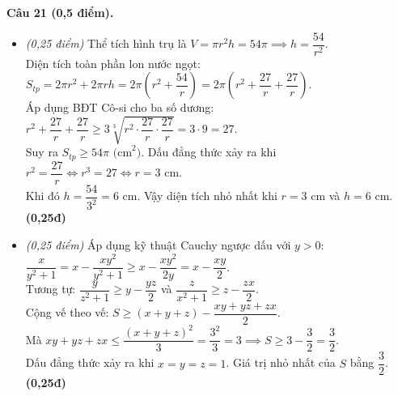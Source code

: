 \documentclass[11pt,a4paper]{article}
\begin{document}
\vspace{1.5mm}
\noindent
\textbf{Câu 21 (0,5 điểm).}
\begin{itemize}
  \item[a)] \textit{(0,25 điểm)}
  Thể tích hình trụ là $V = \pi r^2 h = 54\pi \implies h = \dfrac{54}{r^2}$.\\
  Diện tích toàn phần lon nước ngọt:
  $S_{tp} = 2\pi r^2 + 2\pi r h = 2\pi \left( r^2 + \dfrac{54}{r} \right) = 2\pi \left( r^2 + \dfrac{27}{r} + \dfrac{27}{r} \right)$.\\
  Áp dụng BĐT Cô-si cho ba số dương:
  $r^2 + \dfrac{27}{r} + \dfrac{27}{r} \ge 3\sqrt[3]{r^2 \cdot \dfrac{27}{r} \cdot \dfrac{27}{r}} = 3 \cdot 9 = 27$.\\
  Suy ra $S_{tp} \ge 54\pi\text{ (cm}^2)$. Dấu đẳng thức xảy ra khi $r^2 = \dfrac{27}{r} \iff r^3 = 27 \iff r = 3\text{ cm}$.\\
  Khi đó $h = \dfrac{54}{3^2} = 6\text{ cm}$. Vậy diện tích nhỏ nhất khi $r = 3\text{ cm}$ và $h = 6\text{ cm}$. \dotfill \textbf{(0,25đ)}

  \item[b)] \textit{(0,25 điểm)}
  Áp dụng kỹ thuật Cauchy ngược dấu với $y > 0$: $\dfrac{x}{y^2 + 1} = x - \dfrac{xy^2}{y^2 + 1} \ge x - \dfrac{xy^2}{2y} = x - \dfrac{xy}{2}$.\\
  Tương tự: $\dfrac{y}{z^2 + 1} \ge y - \dfrac{yz}{2}$ và $\dfrac{z}{x^2 + 1} \ge z - \dfrac{zx}{2}$.\\
  Cộng vế theo vế: $S \ge (x + y + z) - \dfrac{xy + yz + zx}{2}$.\\
  Mà $xy + yz + zx \le \dfrac{(x+y+z)^2}{3} = \dfrac{3^2}{3} = 3 \implies S \ge 3 - \dfrac{3}{2} = \dfrac{3}{2}$.\\
  Dấu đẳng thức xảy ra khi $x = y = z = 1$. Giá trị nhỏ nhất của $S$ bằng $\dfrac{3}{2}$. \dotfill \textbf{(0,25đ)}
\end{itemize}
\end{document}
